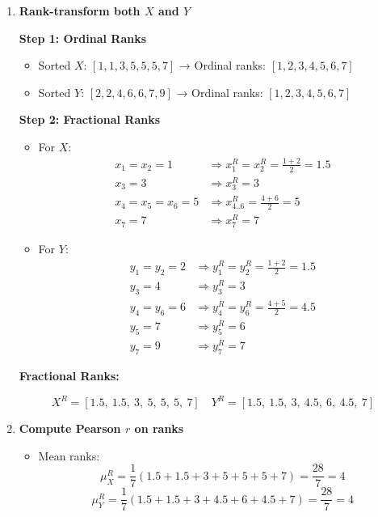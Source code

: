 \documentclass{article}
\begin{document}
\begin{enumerate}
    \item \textbf{Rank-transform both $X$ and $Y$}

    \textbf{Step 1: Ordinal Ranks}

    \begin{itemize}
        \item Sorted $X$: $[1, 1, 3, 5, 5, 5, 7]$ → Ordinal ranks: $[1, 2, 3, 4, 5, 6, 7]$
        \item Sorted $Y$: $[2, 2, 4, 6, 6, 7, 9]$ → Ordinal ranks: $[1, 2, 3, 4, 5, 6, 7]$
    \end{itemize}

    \textbf{Step 2: Fractional Ranks}

    \begin{itemize}
        \item For $X$:
        \[
        \begin{aligned}
        x_1 = x_2 = 1 &\Rightarrow x_1^R = x_2^R = \frac{1 + 2}{2} = 1.5 \\
        x_3 = 3 &\Rightarrow x_3^R = 3 \\
        x_4 = x_5 = x_6 = 5 &\Rightarrow x_{4..6}^R = \frac{4 + 6}{2} = 5 \\
        x_7 = 7 &\Rightarrow x_7^R = 7
        \end{aligned}
        \]
        \item For $Y$:
        \[
        \begin{aligned}
        y_1 = y_2 = 2 &\Rightarrow y_1^R = y_2^R = \frac{1 + 2}{2} = 1.5 \\
        y_3 = 4 &\Rightarrow y_3^R = 3 \\
        y_4 = y_6 = 6 &\Rightarrow y_4^R = y_6^R = \frac{4 + 5}{2} = 4.5 \\
        y_5 = 7 &\Rightarrow y_5^R = 6 \\
        y_7 = 9 &\Rightarrow y_7^R = 7
        \end{aligned}
        \]
    \end{itemize}

    \textbf{Fractional Ranks:}

    \[
    X^R = [1.5,\ 1.5,\ 3,\ 5,\ 5,\ 5,\ 7]
    \quad
    Y^R = [1.5,\ 1.5,\ 3,\ 4.5,\ 6,\ 4.5,\ 7]
    \]

    \item \textbf{Compute Pearson $r$ on ranks}

    \begin{itemize}
        \item Mean ranks:
        \[
        \mu_X^R = \frac{1}{7}(1.5 + 1.5 + 3 + 5 + 5 + 5 + 7) = \frac{28}{7} = 4
        \]
        \[
        \mu_Y^R = \frac{1}{7}(1.5 + 1.5 + 3 + 4.5 + 6 + 4.5 + 7) = \frac{28}{7} = 4
        \]


\end{itemize}
\end{enumerate}
\end{document}
